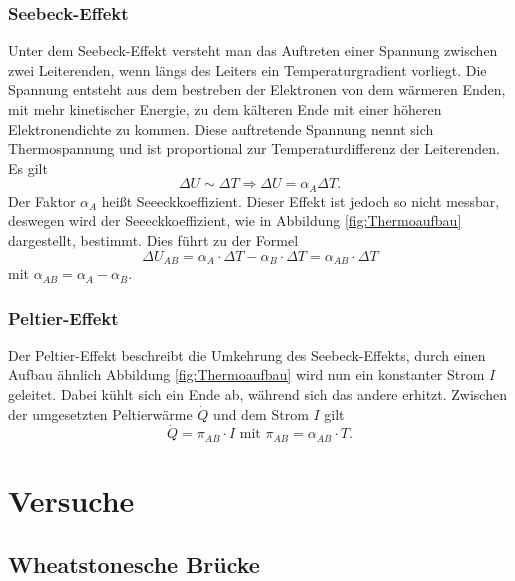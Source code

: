 \subsubsection{Seebeck-Effekt}
Unter dem Seebeck-Effekt versteht man das Auftreten einer Spannung zwischen zwei Leiterenden, wenn  längs des Leiters ein Temperaturgradient vorliegt. Die Spannung entsteht aus dem bestreben der Elektronen von dem wärmeren Enden, mit mehr kinetischer Energie, zu dem kälteren Ende mit einer höheren Elektronendichte zu kommen. Diese auftretende Spannung nennt sich Thermospannung und ist proportional zur Temperaturdifferenz der Leiterenden. Es gilt
\begin{equation}
\Delta U \sim \Delta T \Rightarrow \Delta U= \alpha_A\Delta T.
\end{equation} 
Der Faktor $\alpha_A$ heißt Seeeckkoeffizient. Dieser Effekt ist jedoch so nicht messbar, deswegen wird der Seeeckkoeffizient, wie in Abbildung \ref{fig:Thermoaufbau} dargestellt, bestimmt. Dies führt zu der Formel
\begin{equation}
\Delta U_{AB}=\alpha_A\cdot \Delta T -\alpha_B\cdot \Delta T = \alpha_{AB}\cdot \Delta T
\label{eq:Thermo}
\end{equation}
mit $\alpha_{AB}=\alpha_A-\alpha_B$.
\subsubsection{Peltier-Effekt}
Der Peltier-Effekt beschreibt die Umkehrung des Seebeck-Effekts, durch einen Aufbau ähnlich Abbildung \ref{fig:Thermoaufbau} wird nun ein konstanter Strom $I$ geleitet. Dabei kühlt sich ein Ende ab, während sich das andere erhitzt. Zwischen der umgesetzten Peltierwärme $\dot Q$ und dem Strom $I$ gilt
\begin{equation}
\dot Q = \pi_{AB}\cdot I \text{ mit } \pi_{AB}=\alpha_{AB}\cdot T.
\end{equation}
\section{Versuche}
\subsection{Wheatstonesche Brücke}
